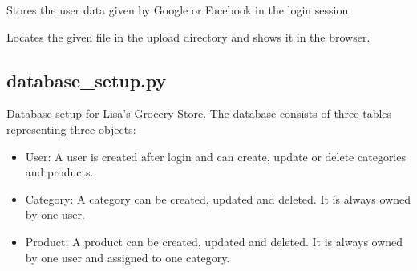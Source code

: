 \documentclass[letterpaper,10pt,english]{sphinxmanual}
\begin{document}

\begin{fulllineitems}
\label{application:application.storeUserData}
Stores the user data
given by Google or Facebook
in the login session.

\end{fulllineitems}


\begin{fulllineitems}
\label{application:application.uploads}
Locates the given file in the upload directory and shows
it in the browser.

\end{fulllineitems}



\subsection{database\_setup.py}
\label{database_setup:database-setup-py}\label{database_setup::doc}\label{database_setup:module-database_setup}
Database setup for Lisa's Grocery Store.
The database consists of three tables representing
three objects:
\begin{itemize}
\item {} 
User:
A user is created after login and can
create, update or delete categories and products.

\item {} 
Category:
A category can be created, updated and deleted.
It is always owned by one user.

\item {} 
Product:
A product can be created, updated and deleted.
It is always owned by one user and assigned
to one category.

\end{itemize}
\end{document}
